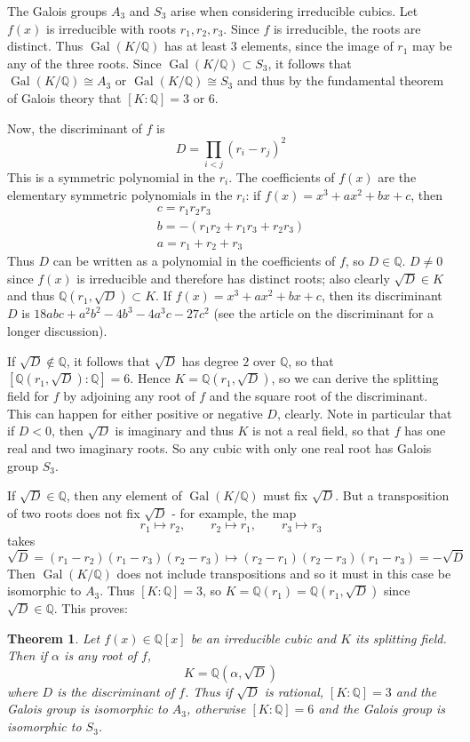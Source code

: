 \documentclass[a4paper,10pt]{article}
\newcommand{\Rats}{\ensuremath{\mathbb Q}}
\DeclareMathOperator{\Gal}{Gal}
\newtheorem{thm}{Theorem}%
\theoremstyle{definition}
\begin{document}
The Galois groups $A_3$ and $S_3$ arise when considering irreducible cubics. Let
$f(x)$ is irreducible with roots $r_1, r_2, r_3$. Since $f$ is irreducible, the
roots are distinct. Thus $\Gal(K/\Rats)$ has at least $3$ elements, since the
image of $r_1$ may be any of the three roots. Since $\Gal(K/\Rats)\subset S_3$,
it follows that $\Gal(K/\Rats)\cong A_3$ or $\Gal(K/\Rats)\cong S_3$ and thus by
the fundamental theorem of Galois theory that $[K:\Rats]=3$ or $6$.

Now, the discriminant of $f$ is \[D=\prod_{i<j} (r_i-r_j)^2\] This is a
symmetric polynomial in the $r_i$. The coefficients of $f(x)$ are the elementary
symmetric polynomials in the $r_i$: if $f(x)=x^3+ax^2+bx+c$, then
\begin{gather*}
c=r_1r_2r_3\\
b=-(r_1r_2+r_1r_3+r_2r_3)\\
a=r_1+r_2+r_3
\end{gather*}
Thus $D$ can be written as a polynomial in the coefficients of $f$, so
$D\in\Rats$. $D\neq 0$ since $f(x)$ is irreducible and therefore has distinct
roots; also clearly $\sqrt{D}\in K$ and thus $\Rats(r_1,\sqrt{D})\subset K$. If
$f(x)=x^3+ax^2+bx+c$, then its discriminant $D$ is $18abc + a^2 b^2 - 4b^3 -
4a^3 c - 27 c^2$ (see the article on the discriminant for a longer discussion).

If $\sqrt{D}\notin\Rats$, it follows that $\sqrt{D}$ has degree $2$ over
$\Rats$, so that $[\Rats(r_1,\sqrt{D}):\Rats]=6$. Hence $K=\Rats(r_1,\sqrt{D})$,
so we can derive the splitting field for $f$ by adjoining any root of $f$ and
the square root of the discriminant. This can happen for either positive or
negative $D$, clearly. Note in particular that if $D<0$, then $\sqrt{D}$ is
imaginary and thus $K$ is not a real field, so that $f$ has one real and two
imaginary roots. So any cubic with only one real root has Galois group $S_3$.

If $\sqrt{D}\in\Rats$, then any element of $\Gal(K/\Rats)$ must fix $\sqrt{D}$.
But a transposition of two roots does not fix $\sqrt{D}$ - for example, the map
\[r_1\mapsto r_2, \qquad r_2\mapsto r_1, \qquad r_3\mapsto r_3\] takes
\[\sqrt{D}=(r_1-r_2)(r_1-r_3)(r_2-r_3)\mapsto
(r_2-r_1)(r_2-r_3)(r_1-r_3)=-\sqrt{D}\] Then $\Gal(K/\Rats)$ does not include
transpositions and so it must in this case be isomorphic to $A_3$. Thus
$[K:\Rats]=3$, so $K=\Rats(r_1)=\Rats(r_1,\sqrt{D})$ since $\sqrt{D}\in\Rats$.
This proves:

\begin{thm} Let $f(x)\in\Rats[x]$ be an irreducible cubic and $K$ its splitting
field. Then if $\alpha$ is any root of $f$, \[K=\Rats(\alpha,\sqrt{D})\] where
$D$ is the discriminant of $f$. Thus if $\sqrt{D}$ is rational, $[K:\Rats]=3$
and the Galois group is isomorphic to $A_3$, otherwise $[K:\Rats]=6$ and the
Galois group is isomorphic to $S_3$.
\end{thm}
\end{document}
